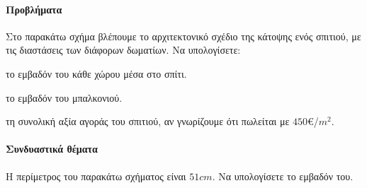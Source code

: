 \documentclass[11pt,a4paper,modern]{FFExercises}
\begin{document}
\paragraph{Προβλήματα}
\askhsh Στο παρακάτω σχήμα βλέπουμε το αρχιτεκτονικό σχέδιο της κάτοψης ενός σπιτιού, με τις διαστάσεις των διάφορων δωματίων. Να υπολογίσετε:
\begin{center}

\end{center}
\begin{alist}
\item το εμβαδόν του κάθε χώρου μέσα στο σπίτι.
\item το εμβαδόν του μπαλκονιού.
\item τη συνολική αξία αγοράς του σπιτιού, αν γνωρίζουμε ότι πωλείται με $450$\euro/$\si{m^2}$.
\end{alist}
\paragraph{Συνδυαστικά θέματα}
\askhsh Η περίμετρος του παρακάτω σχήματος είναι $51\si{cm}$. Να υπολογίσετε το εμβαδόν του.
\begin{center}
\end{center}
\end{document}
